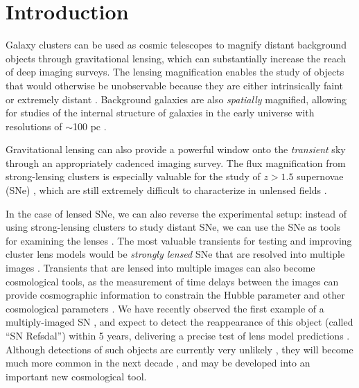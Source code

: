 
\section{Introduction}
\label{sec:Introduction}

Galaxy clusters can be used as cosmic telescopes to magnify distant
background objects through gravitational lensing, which can
substantially increase the reach of deep imaging surveys.  The lensing
magnification enables the study of objects that would otherwise be
unobservable because they are either intrinsically
faint \citep[e.g.][]{Schenker:2012,Alavi:2014} or extremely
distant \citep[e.g.][]{Franx:1997,Ellis:2001,Hu:2002,Kneib:2004,Richard:2006,Richard:2008,Bouwens:2009a,Maizy:2010,Zheng:2012,Coe:2013,Bouwens:2014,Zitrin:2014b}.
Background galaxies are also {\it spatially} magnified, allowing for
studies of the internal structure of galaxies in the early universe
with resolutions of $\sim$100
pc \citep[e.g.]{Stark:2008,Jones:2010,Yuan:2011,Livermore:2015}.


Gravitational lensing can also provide a powerful window onto the {\it
transient} sky through an appropriately cadenced imaging survey.  The
flux magnification from strong-lensing clusters is especially valuable
for the study of $z>1.5$ supernovae
(SNe) \citep[e.g.]{Kovner:1988,Kolatt:1998,Sullivan:2000,Saini:2000,Gunnarsson:2003,Goobar:2009,Postman:2012},
which are still extremely difficult to characterize in unlensed
fields \citep[e.g.]{Riess:2001,Riess:2007,Suzuki:2012,Rodney:2012,Rubin:2013,Jones:2013}.


In the case of lensed SNe, we can also reverse the experimental setup:
instead of using strong-lensing clusters to study distant SNe, we can
use the SNe as tools for examining the lenses \citep{Riehm:2011}.  The
most valuable transients for testing and improving cluster lens models
would be {\it strongly lensed} SNe that are resolved into multiple
images \citep{Holz:2001,Oguri:2003}.  Transients that are lensed into
multiple images can also become cosmological tools, as the measurement
of time delays between the images can provide cosmographic information
to constrain the Hubble parameter \citep{Refsdal:1964} and other
cosmological parameters \citep{Linder:2011}.  We have recently
observed the first example of a multiply-imaged
SN \citep{Kelly:2015}, and expect to detect the reappearance of this
object (called ``SN Refsdal'') within 5 years, delivering a precise
test of lens model predictions \citep{Oguri:2015,Sharon:2015}.
Although detections of such objects are currently very
unlikely \citep{Li:2012}, they will become much more common in the
next decade \citep{Coe:2009,Dobke:2009}, and may be developed into an
important new cosmological tool.



